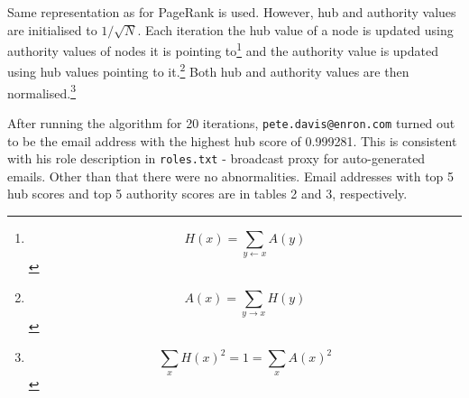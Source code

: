 \documentclass{tufte-handout}
\begin{document}
Same representation as for PageRank is used. However, hub and authority
values are initialised to $1/\sqrt{N}$. Each iteration the hub value of
a node is updated using authority values of nodes it is pointing
to\footnote{\[H(x) = \sum_{y \leftarrow x} A(y)\]} and the authority
value is updated using hub values pointing to it.\footnote{\[A(x) = \sum_{y \rightarrow x} H(y)\]}
Both hub and authority values are then normalised.\footnote{\[\sum_{x} H(x)^2 = 1 = \sum_{x} A(x)^2\]}

After running the algorithm for 20 iterations,
\texttt{pete.davis@enron.com} turned out to be the email address with
the highest hub score of 0.999281. This is consistent with his role
description in \texttt{roles.txt} - broadcast proxy for auto-generated
emails. Other than that there were no abnormalities. Email addresses
with top 5 hub scores and top 5 authority scores are in tables 2 and 3,
respectively.
\end{document}
